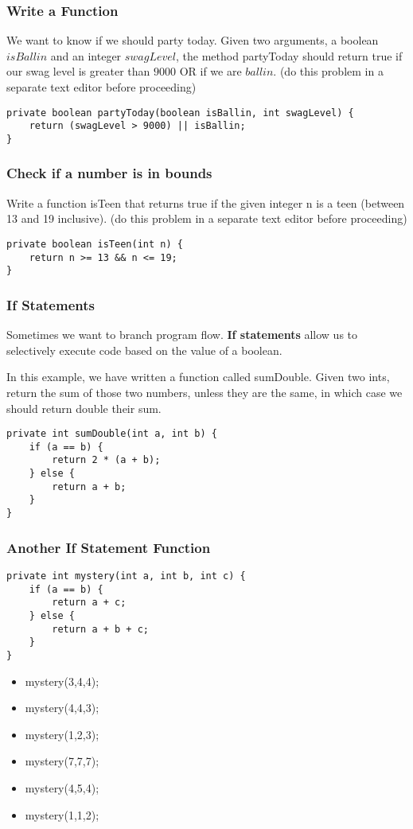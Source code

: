 \documentclass{beamer}
\begin{document}
\begin{frame}[fragile]
\frametitle{Write a Function}
We want to know if we should party today. Given two arguments, a boolean $isBallin$ and an integer $swagLevel$, the method partyToday should return true if our swag level is greater than $9000$ OR if we are $ballin$.
\pause
(do this problem in a separate text editor before proceeding)
\pause
\begin{lstlisting}
private boolean partyToday(boolean isBallin, int swagLevel) {
    return (swagLevel > 9000) || isBallin;
}
\end{lstlisting}
\end{frame}

\begin{frame}[fragile]
\frametitle{Check if a number is in bounds}
Write a function isTeen that returns true if the given integer n is a teen (between 13 and 19 inclusive).
\pause
(do this problem in a separate text editor before proceeding)
\pause
\begin{lstlisting}
private boolean isTeen(int n) {
    return n >= 13 && n <= 19;
}
\end{lstlisting}
\end{frame}

\begin{frame}[fragile]
\frametitle{If Statements}
Sometimes we want to branch program flow. \textbf{If statements} allow us to selectively execute code based on the value of a boolean.
\pause

In this example, we have written a function called sumDouble. Given two ints, return the sum of those two numbers, unless they are the same, in which case we should return double their sum.
\pause
\begin{lstlisting}
private int sumDouble(int a, int b) {
    if (a == b) {
        return 2 * (a + b);
    } else {
        return a + b;
    }
}
\end{lstlisting}
\end{frame}

\begin{frame}[fragile]
\frametitle{Another If Statement Function}
\begin{lstlisting}
private int mystery(int a, int b, int c) {
    if (a == b) {
        return a + c;
    } else {
        return a + b + c;
    }
}
\end{lstlisting}
\begin{itemize}
\item<2->mystery(3,4,4);
\item<3->mystery(4,4,3);
\item<4->mystery(1,2,3);
\item<5->mystery(7,7,7);
\item<6->mystery(4,5,4);
\item<7->mystery(1,1,2);
\end{itemize}
\end{frame}
\end{document}
